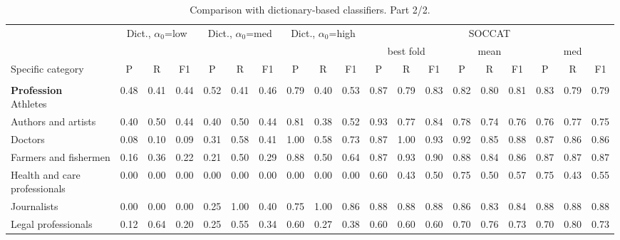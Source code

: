 \begin{table}[htb]
\centering
\renewcommand{\arraystretch}{0.9}
\scriptsize
\begin{threeparttable}
\caption{Comparison with dictionary-based classifiers. Part 2/2.}
\label{tab:dictionary_alpha0_sweep_full_part2}
\begin{tabular}{l ccc ccc ccc ccc ccc ccc}
\toprule
 & \multicolumn{3}{c}{Dict., $\alpha_0$=low} & \multicolumn{3}{c}{Dict., $\alpha_0$=med} & \multicolumn{3}{c}{Dict., $\alpha_0$=high} & \multicolumn{9}{c}{SOCCAT} \\
\cmidrule(lr){2-4} \cmidrule(lr){5-7} \cmidrule(lr){8-10} \cmidrule(lr){11-19}
 & \multicolumn{3}{c}{} & \multicolumn{3}{c}{} & \multicolumn{3}{c}{} & \multicolumn{3}{c}{best fold} & \multicolumn{3}{c}{mean} & \multicolumn{3}{c}{med} \\
\cmidrule(lr){2-4} \cmidrule(lr){5-7} \cmidrule(lr){8-10} \cmidrule(lr){11-13} \cmidrule(lr){14-16} \cmidrule(lr){17-19}
Specific category & P & R & F1 & P & R & F1 & P & R & F1 & P & R & F1 & P & R & F1 & P & R & F1 \\
\midrule
\rule{0pt}{5pt} &  &  &  &  &  &  &  &  &  &  &  &  &  &  &  &  &  &  \\
\shortstack[l]{\textbf{Profession}\\[3pt]Athletes} & 0.48 & 0.41 & 0.44 & 0.52 & 0.41 & 0.46 & 0.79 & 0.40 & 0.53 & 0.87 & 0.79 & 0.83 & 0.82 & 0.80 & 0.81 & 0.83 & 0.79 & 0.79 \\
Authors and artists & 0.40 & 0.50 & 0.44 & 0.40 & 0.50 & 0.44 & 0.81 & 0.38 & 0.52 & 0.93 & 0.77 & 0.84 & 0.78 & 0.74 & 0.76 & 0.76 & 0.77 & 0.75 \\
Doctors & 0.08 & 0.10 & 0.09 & 0.31 & 0.58 & 0.41 & 1.00 & 0.58 & 0.73 & 0.87 & 1.00 & 0.93 & 0.92 & 0.85 & 0.88 & 0.87 & 0.86 & 0.86 \\
Farmers and fishermen & 0.16 & 0.36 & 0.22 & 0.21 & 0.50 & 0.29 & 0.88 & 0.50 & 0.64 & 0.87 & 0.93 & 0.90 & 0.88 & 0.84 & 0.86 & 0.87 & 0.87 & 0.87 \\
\shortstack[l]{Health and care\\[-3pt]professionals} & 0.00 & 0.00 & 0.00 & 0.00 & 0.00 & 0.00 & 0.00 & 0.00 & 0.00 & 0.60 & 0.43 & 0.50 & 0.75 & 0.50 & 0.57 & 0.75 & 0.43 & 0.55 \\
Journalists & 0.00 & 0.00 & 0.00 & 0.25 & 1.00 & 0.40 & 0.75 & 1.00 & 0.86 & 0.88 & 0.88 & 0.88 & 0.86 & 0.83 & 0.84 & 0.88 & 0.88 & 0.88 \\
Legal professionals & 0.12 & 0.64 & 0.20 & 0.25 & 0.55 & 0.34 & 0.60 & 0.27 & 0.38 & 0.60 & 0.60 & 0.60 & 0.70 & 0.76 & 0.73 & 0.70 & 0.80 & 0.73 \\

\end{tabular}
\end{threeparttable}
\end{table}
